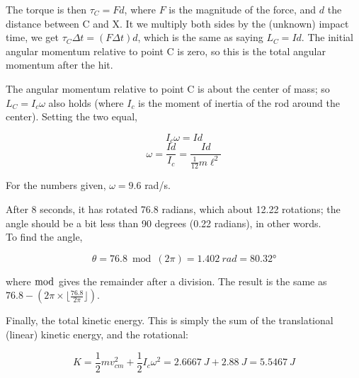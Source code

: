 \documentclass[8.01x]{subfiles}
\begin{document}
The torque is then $\tau_C = F d$, where $F$ is the magnitude of the force, and $d$ the distance between C and X. It we multiply both sides by the (unknown) impact time, we get $\tau_C \Delta t = (F \Delta t) d$, which is the same as saying $L_C = I d$. The initial angular momentum relative to point C is zero, so this is the total angular momentum after the hit.

The angular momentum relative to point C is about the center of mass; so $L_C = I_c \omega$ also holds (where $I_c$ is the moment of inertia of the rod around the center). Setting the two equal,

\begin{equation}
I_c \omega = I d
\end{equation}
\begin{equation}
\omega = \frac{I d}{I_c} = \frac{I d}{\frac{1}{12} m \ell^2}
\end{equation}

For the numbers given, $\omega = 9.6$ rad/s.

After 8 seconds, it has rotated 76.8 radians, which about 12.22 rotations; the angle should be a bit less than 90 degrees (0.22 radians), in other words.\\
To find the angle,

\begin{equation}
\theta = 76.8 \bmod (2 \pi) = \SI{1.402}{rad} = \ang{80.32}
\end{equation}

where $\bmod$ gives the remainder after a division. The result is the same as $76.8 - (2 \pi \times \lfloor \frac{76.8}{2 \pi} \rfloor)$.

Finally, the total kinetic energy. This is simply the sum of the translational (linear) kinetic energy, and the rotational:

\begin{equation}
K = \frac{1}{2} m v_{cm}^2 + \frac{1}{2} I_c \omega^2 = \SI{2.6667}{J} + \SI{2.88}{J} = \SI{5.5467}{J}
\end{equation}
\end{document}
